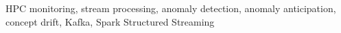 \begin{IEEEkeywords}
HPC monitoring, stream processing, anomaly detection, anomaly anticipation, concept drift, Kafka, Spark Structured Streaming
\end{IEEEkeywords}
